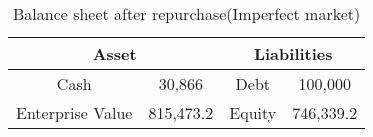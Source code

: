 \begin{table}[ht]
\centering
\begin{tabular}{@{}cccc@{}}
\toprule
\multicolumn{2}{c}{Asset}  & \multicolumn{2}{c}{Liabilities} \\ \midrule
Cash             & 30,866 & Debt           & 100,000              \\
Enterprise Value & 815,473.2 & Equity         & 746,339.2        \\ \bottomrule
\end{tabular}
\caption{Balance sheet after repurchase(Imperfect market)}
\label{tab:bs_after_repurchase_imperfect}
\end{table}
